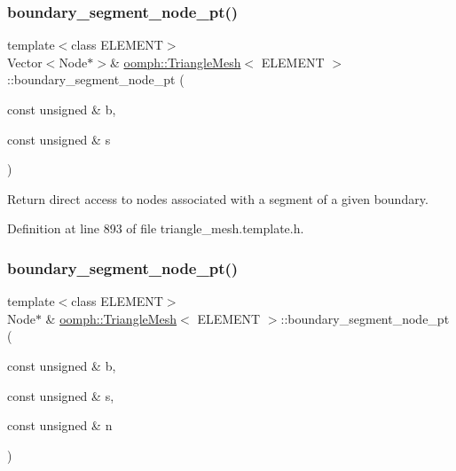 \subsubsection{\texorpdfstring{boundary\+\_\+segment\+\_\+node\+\_\+pt()}{boundary\_segment\_node\_pt()}\hspace{0.1cm}{\footnotesize\ttfamily [2/3]}}
{\footnotesize\ttfamily template$<$class E\+L\+E\+M\+E\+NT$>$ \\
Vector$<$Node$\ast$$>$\& \hyperlink{classoomph_1_1TriangleMesh}{oomph\+::\+Triangle\+Mesh}$<$ E\+L\+E\+M\+E\+NT $>$\+::boundary\+\_\+segment\+\_\+node\+\_\+pt (\begin{DoxyParamCaption}\item[{const unsigned \&}]{b,  }\item[{const unsigned \&}]{s }\end{DoxyParamCaption})\hspace{0.3cm}{\ttfamily [inline]}}



Return direct access to nodes associated with a segment of a given boundary. 



Definition at line 893 of file triangle\+\_\+mesh.\+template.\+h.

\mbox{\label{classoomph_1_1TriangleMesh_ad7acd0ef2644130b830eed3cd3a9a259}} 
\subsubsection{\texorpdfstring{boundary\+\_\+segment\+\_\+node\+\_\+pt()}{boundary\_segment\_node\_pt()}\hspace{0.1cm}{\footnotesize\ttfamily [3/3]}}
{\footnotesize\ttfamily template$<$class E\+L\+E\+M\+E\+NT$>$ \\
Node$\ast$ \& \hyperlink{classoomph_1_1TriangleMesh}{oomph\+::\+Triangle\+Mesh}$<$ E\+L\+E\+M\+E\+NT $>$\+::boundary\+\_\+segment\+\_\+node\+\_\+pt (\begin{DoxyParamCaption}\item[{const unsigned \&}]{b,  }\item[{const unsigned \&}]{s,  }\item[{const unsigned \&}]{n }\end{DoxyParamCaption})\hspace{0.3cm}{\ttfamily [inline]}}



